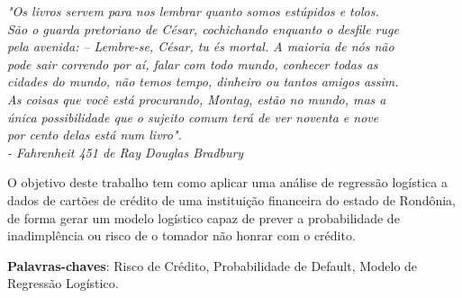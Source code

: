\documentclass[
	12pt,				%
	openright,			%
	oneside,      %
	a4paper,			%
	english,			%
	french,				%
	spanish,			%
	brazil,				%
	]{abntex2}\usepackage[]{graphicx}\usepackage[]{xcolor}
\begin{document}

\frenchspacing


\imprimircapa

\imprimirfolhaderosto
\clearpage

\begin{epigrafe} 
  \vspace*{\fill} 
  \begin{flushright} 
  \textit{"Os livros servem para nos lembrar quanto somos estúpidos e tolos. 
      \\ São o guarda pretoriano de César, cochichando enquanto o desfile ruge 
      \\ pela avenida: – Lembre-se, César, tu és mortal. A maioria de nós não 
      \\ pode sair correndo por aí, falar com todo mundo, conhecer todas as 
      \\ cidades do mundo, não temos tempo, dinheiro ou tantos amigos assim. 
      \\ As coisas que você está procurando, Montag, estão no mundo, mas a 
      \\ única possibilidade que o sujeito comum terá de ver noventa e nove 
      \\ por cento delas está num livro". 
      \\ - Fahrenheit 451 de Ray Douglas Bradbury} 
  \end{flushright} 
\end{epigrafe}

\begin{resumo} 
  O objetivo deste trabalho tem como aplicar uma análise de regressão logística a dados
  de cartões de crédito de uma instituição financeira do estado de Rondônia, de forma
  gerar um modelo logístico capaz de prever a probabilidade de inadimplência ou risco
  de o tomador não honrar com o crédito.
  \vspace{\onelineskip} 
  \noindent
  
  \textbf{Palavras-chaves}: Risco de Crédito, Probabilidade de Default, Modelo de Regressão Logístico. 
\end{resumo}
\end{document}
